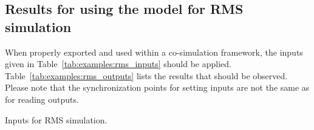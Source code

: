 \subsection{Results for using the model for RMS simulation}
\label{sec:examples:results_rms}

When properly exported and used within a co-simulation framework, the inputs given in Table~\ref{tab:examples:rms_inputs} should be applied.
Table~\ref{tab:examples:rms_outputs} lists the results that should be observed.
Please note that the synchronization points for setting inputs are not the same as for reading outputs.


\begin{table}[h!]
\caption{Inputs for RMS simulation.}
\label{tab:examples:rms_inputs}

\vspace*{2ex}

\caption{Expected outputs from RMS simulation.}
\label{tab:examples:rms_outputs}
\end{table}

